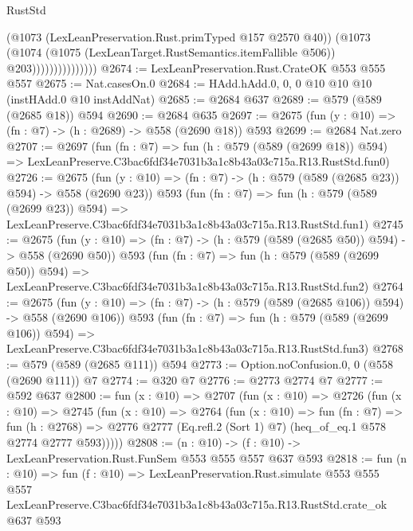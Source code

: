 \begin{lexlean}{RustStd}
\begin{coremodule}
                              (@1073 (LexLeanPreservation.Rust.primTyped @157 @2570 @40))
                              (@1073
                                (@1074
                                  (@1075 (LexLeanTarget.RustSemantics.itemFallible @506))
                                  @203)))))))))))))))
@2674 := LexLeanPreservation.Rust.CrateOK @553 @555 @557
@2675 := Nat.casesOn.{0}
@2684 := HAdd.hAdd.{0, 0, 0} @10 @10 @10 (instHAdd.{0} @10 instAddNat)
@2685 := @2684 @637
@2689 := @579 (@589 (@2685 @18)) @594
@2690 := @2684 @635
@2697 := @2675 (fun (y : @10) => (fn : @7) -> (h : @2689) -> @558 (@2690 @18)) @593
@2699 := @2684 Nat.zero
@2707 := @2697
    (fun (fn : @7) =>
    fun (h : @579 (@589 (@2699 @18)) @594) =>
    LexLeanPreserve.C3bac6fdf34e7031b3a1c8b43a03c715a.R13.RustStd.fun0)
@2726 := @2675
    (fun (y : @10) => (fn : @7) -> (h : @579 (@589 (@2685 @23)) @594) -> @558 (@2690 @23))
    @593
    (fun (fn : @7) =>
    fun (h : @579 (@589 (@2699 @23)) @594) =>
    LexLeanPreserve.C3bac6fdf34e7031b3a1c8b43a03c715a.R13.RustStd.fun1)
@2745 := @2675
    (fun (y : @10) => (fn : @7) -> (h : @579 (@589 (@2685 @50)) @594) -> @558 (@2690 @50))
    @593
    (fun (fn : @7) =>
    fun (h : @579 (@589 (@2699 @50)) @594) =>
    LexLeanPreserve.C3bac6fdf34e7031b3a1c8b43a03c715a.R13.RustStd.fun2)
@2764 := @2675
    (fun (y : @10) => (fn : @7) -> (h : @579 (@589 (@2685 @106)) @594) -> @558 (@2690 @106))
    @593
    (fun (fn : @7) =>
    fun (h : @579 (@589 (@2699 @106)) @594) =>
    LexLeanPreserve.C3bac6fdf34e7031b3a1c8b43a03c715a.R13.RustStd.fun3)
@2768 := @579 (@589 (@2685 @111)) @594
@2773 := Option.noConfusion.{0, 0} (@558 (@2690 @111)) @7
@2774 := @320 @7
@2776 := @2773 @2774 @7
@2777 := @592 @637
@2800 := fun (x : @10) =>
  @2707
    (fun (x : @10) =>
    @2726
      (fun (x : @10) =>
      @2745
        (fun (x : @10) =>
        @2764
          (fun (x : @10) =>
          fun (fn : @7) =>
          fun (h : @2768) =>
          @2776 @2777 (Eq.refl.{2} (Sort 1) @7) (heq_of_eq.{1} @578 @2774 @2777 @593)))))
@2808 := (n : @10) -> (f : @10) -> LexLeanPreservation.Rust.FunSem @553 @555 @557 @637 @593
@2818 := fun (n : @10) =>
  fun (f : @10) =>
  LexLeanPreservation.Rust.simulate
    @553
    @555
    @557
    LexLeanPreserve.C3bac6fdf34e7031b3a1c8b43a03c715a.R13.RustStd.crate_ok
    @637
    @593
\end{coremodule}
\end{lexlean}
